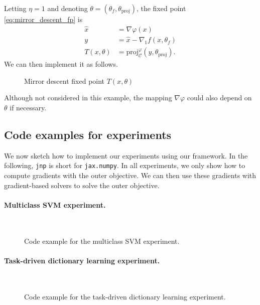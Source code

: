 \documentclass{article}
\def\cC{{\mathcal{C}}}
\def\proj{{\text{proj}}}
\begin{document}
Letting $\eta=1$ and
denoting $\theta = (\theta_f, \theta_{\proj})$,
the fixed point \eqref{eq:mirror_descent_fp} is
\begin{align}
    \hat x &= \nabla \varphi(x) \\
    y &= \hat x - \nabla_1 f(x, \theta_f) \\
    T(x, \theta) &= \proj_\cC^\varphi(y, \theta_{\proj}).
\end{align}
We can then implement it as follows.
\begin{figure}[H]
\centering
{}
\caption{Mirror descent fixed point $T(x, \theta)$}
\label{fig:mirror_descent_code}
\end{figure}
Although not considered in this example, the mapping $\nabla \varphi$ could also
depend on $\theta$ if necessary.

\subsection{Code examples for experiments}

We now sketch how to implement our experiments using our framework.
In the following, \texttt{jnp} is short for \texttt{jax.numpy}.
In all experiments, we only show how to compute gradients
with the outer objective. We can then use these gradients with gradient-based
solvers to solve the outer objective.

\paragraph{Multiclass SVM experiment.}

~

\begin{figure}[H]
\centering
{}
\caption{Code example for the multiclass SVM experiment.}
\label{fig:msvm_code}
\end{figure}

\paragraph{Task-driven dictionary learning experiment.}

~

\begin{figure}[H]
\centering
{}
\caption{Code example for the task-driven dictionary learning experiment.}
\label{fig:sparse_coding_code}
\end{figure}
\end{document}
